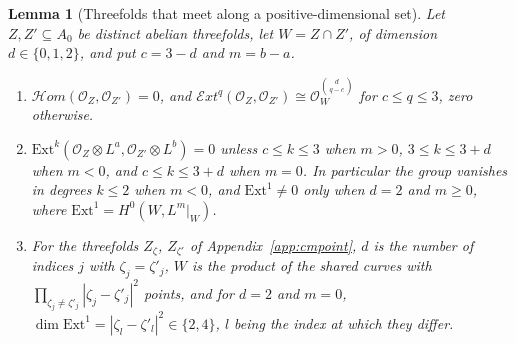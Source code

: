 \documentclass[11pt,reqno]{amsart}
\numberwithin{equation}{section}
\theoremstyle{plain}
\newtheorem{lemma}[theorem]{Lemma}
\theoremstyle{definition}
\newcommand{\Ext}{\mathrm{Ext}}
\begin{document}
\begin{lemma}[Threefolds that meet along a positive-dimensional set]\label{lem:cmmeet}
Let $Z,Z'\subseteq A_{0}$ be distinct abelian threefolds, let $W=Z\cap Z'$, of dimension $d\in\{0,1,2\}$, and put $c=3-d$ and $m=b-a$.
\begin{enumerate}[label=\textup{(\roman*)},leftmargin=2.4em,itemsep=2pt]
\item $\mathcal{H}om(\mathcal{O}_{Z},\mathcal{O}_{Z'})=0$, and $\mathcal{E}xt^{q}(\mathcal{O}_{Z},\mathcal{O}_{Z'})\cong\mathcal{O}_{W}^{\binom{d}{q-c}}$ for $c\le q\le3$, zero otherwise.
\item $\Ext^{k}(\mathcal{O}_{Z}\otimes L^{a},\mathcal{O}_{Z'}\otimes L^{b})=0$ unless $c\le k\le3$ when $m>0$, $3\le k\le3+d$ when $m<0$, and $c\le k\le3+d$ when $m=0$. In particular the group vanishes in degrees $k\le2$ when $m<0$, and $\Ext^{1}\ne0$ only when $d=2$ and $m\ge0$, where $\Ext^{1}=H^{0}(W,L^{m}|_{W})$.
\item For the threefolds $Z_{\zeta}$, $Z_{\zeta'}$ of Appendix~\ref{app:cmpoint}, $d$ is the number of indices $j$ with $\zeta_{j}=\zeta'_{j}$, $W$ is the product of the shared curves with $\prod_{\zeta_{j}\ne\zeta'_{j}}|\zeta_{j}-\zeta'_{j}|^{2}$ points, and for $d=2$ and $m=0$, $\dim\Ext^{1}=|\zeta_{l}-\zeta'_{l}|^{2}\in\{2,4\}$, $l$ being the index at which they differ.
\end{enumerate}
\end{lemma}
\end{document}
